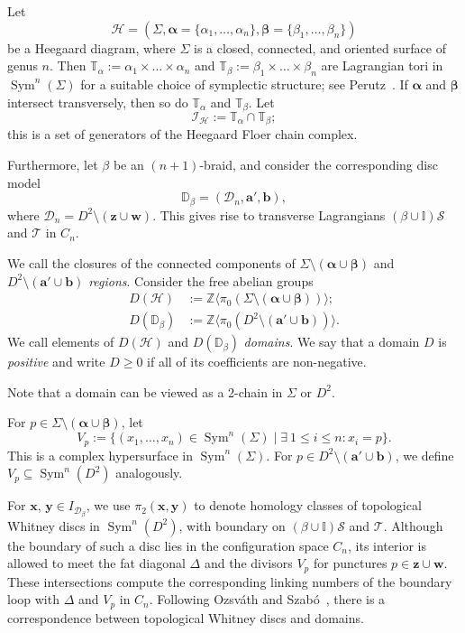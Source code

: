 \documentclass[11pt]{amsart}
\numberwithin{equation}{section}
\numberwithin{figure}{section}
\theoremstyle{definition}
\newcommand{\cD}{\mathcal{D}}
\newcommand{\cH}{\mathcal{H}}
\newcommand{\cI}{\mathcal{I}}
\newcommand{\cs}{\mathscr{S}}
\newcommand{\ct}{\mathscr{T}}
\newcommand{\bD}{\mathbb{D}}
\newcommand{\bI}{\mathbb{I}}
\newcommand{\bZ}{\mathbb{Z}}
\DeclareMathOperator{\Sym}{Sym}
\newcommand{\as}{\boldsymbol{\alpha}}
\newcommand{\bs}{\boldsymbol{\beta}}
\newcommand{\ba}{\boldsymbol{a}}
\newcommand{\bb}{\boldsymbol{b}}
\newcommand{\ws}{\boldsymbol{w}}
\newcommand{\xs}{\boldsymbol{x}}
\newcommand{\ys}{\boldsymbol{y}}
\newcommand{\zs}{\boldsymbol{z}}
\begin{document}
Let 
\[
\mathscr H = (\Sigma, \as = \{\alpha_1, \dots, \alpha_n\}, \bs = \{\beta_1,\dots,\beta_n\})
\]
be a Heegaard diagram, where $\Sigma$ is a closed, connected, and oriented surface of genus $n$. Then $\mathbb T_{\alpha} := \alpha_1 \times \dots \times \alpha_n$ and $\mathbb T_{\beta} := \beta_1 \times \dots \times \beta_n$ are Lagrangian tori in $\Sym^n(\Sigma)$ for a suitable choice of symplectic structure; see Perutz~\cite{Perutz}. If $\as$ and $\bs$ intersect transversely, then so do $\mathbb T_\alpha$ and $\mathbb T_\beta$. Let 
\[
\cI_{\cH} := \mathbb T_{\alpha} \cap \mathbb T_{\beta};
\]
this is a set of generators of the Heegaard Floer chain complex.

Furthermore, let $\beta$ be an $(n+1)$-braid, and consider the corresponding disc model 
\[
\bD_\beta = (\cD_n, \ba', \bb),
\]
where $\cD_n = D^2 \setminus (\zs \cup \ws)$. This gives rise to transverse Lagrangians $(\beta \cup \bI)\cs$ and $\ct$ in $C_n$.

\begin{defn} We call the closures of the connected components of $\Sigma \setminus (\as \cup \bs)$ and $D^2 \setminus (\ba' \cup \bb)$ \emph{regions}. Consider the free abelian groups
\[
\begin{split}
D(\cH) &:= \bZ\langle \pi_0(\Sigma \setminus (\as \cup \bs)) \rangle; \\
D(\bD_\beta) &:= \bZ\langle \pi_0(D^2 \setminus (\ba' \cup \bb)) \rangle.
\end{split}
\]
We call elements of $D(\cH)$ and $D(\bD_\beta)$ \emph{domains}. We say that a domain $D$ is \emph{positive} and write $D \ge 0$ if all of its coefficients are non-negative.
\end{defn}

Note that a domain can be viewed as a 2-chain in $\Sigma$ or $D^2$.

\begin{defn}
For $p \in \Sigma \setminus (\as \cup \bs)$, let
\[
V_p:=\{ (x_1,\dots,x_n) \in \Sym^n(\Sigma) \mid \exists \ 1\leq i \leq n : x_i=p
\}.
\]
This is a complex hypersurface in $\Sym^n(\Sigma)$. For $p \in D^2 \setminus (\ba' \cup \bb)$, we define $V_p \subseteq \Sym^n(D^2)$ analogously.
\end{defn}

For $\xs$, $\ys \in I_{\cD_\beta}$, we use $\pi_2(\xs,\ys)$ to denote homology classes of topological Whitney discs in $\Sym^n(D^2)$, with boundary on $(\beta \cup \bI)\cs$ and $\ct$. Although the boundary of such a disc lies in the configuration space $C_n$, its interior is allowed to meet the fat diagonal $\Delta$ and the divisors $V_p$ for punctures $p \in \zs \cup \ws$. These intersections compute the corresponding linking numbers of the boundary loop with $\Delta$ and $V_p$ in $C_n$. Following Ozsv\'ath and Szab\'o~\cite{OS2}, there is a correspondence between topological Whitney discs and domains.
\end{document}
